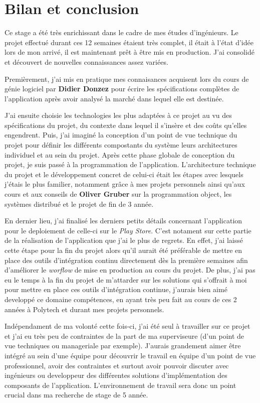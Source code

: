 \chapter{Bilan et conclusion}
\label{chapter:bilan}

Ce stage a été très enrichissant dans le cadre de mes études d'ingénieurs. Le projet effectué durant ces 12 semaines étaient très complet, il était à l'état d'idée lors de mon arrivé, il est maintenant prêt à être mis en production. J'ai consolidé et découvert de nouvelles connaissances assez variées.

Premièrement, j'ai mis en pratique mes connaisances acquisent lors du cours de génie logiciel par \textbf{Didier Donzez} pour écrire les spécifications complètes de l'application après avoir analysé la marché dans lequel elle est destinée.

J'ai ensuite choisie les technologies les plus adaptées à ce projet au vu des spécifications du projet, du contexte dans lequel il s'insère et des coûts qu'elles engendrent. Puis, j'ai imaginé la conception d'un point de vue technique du projet pour définir les différents compostants du système leurs architectures individuel et au sein du projet. Après cette phase globale de conception du projet, je suis passé à la programmation de l'application. L'architecture technique du projet et le développement concret de celui-ci était les étapes avec lesquels j'étais le plus familier, notamment grâce à mes projets personnels ainsi qu'aux cours et aux conseils de \textbf{Oliver Gruber} sur la programmation object, les systèmes distribué et le projet de fin de 3 année.

En dernier lieu, j'ai finalisé les derniers petits détails concernant l'application pour le deploiement de celle-ci sur le \textit{Play Store}. C'est notament sur cette partie de la réalisation de l'application que j'ai le plus de regrets. En effet, j'ai laissé cette étape pour la fin du projet alors qu'il aurait été préférable de mettre en place des outils d'intégration continu directement dès la première semaines afin d'améliorer le \textit{worflow} de mise en production au cours du projet. De plus, j'ai pas eu le temps à la fin du projet de m'attarder sur les solutions qui s'offrait à moi pour mettre en place ces outils d'intégration continue, j'aurais bien aimé developpé ce domaine compétences, en ayant très peu fait au cours de ces 2 années à Polytech et durant mes projets personnels.

Indépendament de ma volonté cette fois-ci, j'ai été seul à travailler sur ce projet et j'ai eu très peu de contraintes de la part de ma superviseure (d'un point de vue techniques ou manageriale par exemple). J'aurais grandement aimer être intégré au sein d'une équipe pour découvrir le travail en équipe d'un point de vue professionnel, avoir des contraintes et surtout avoir pouvoir discuter avec ingénieurs ou developpeur des différentes solutions d'implémentation des composants de l'application. L'environnement de travail sera donc un point crucial dans ma recherche de stage de 5 année.

